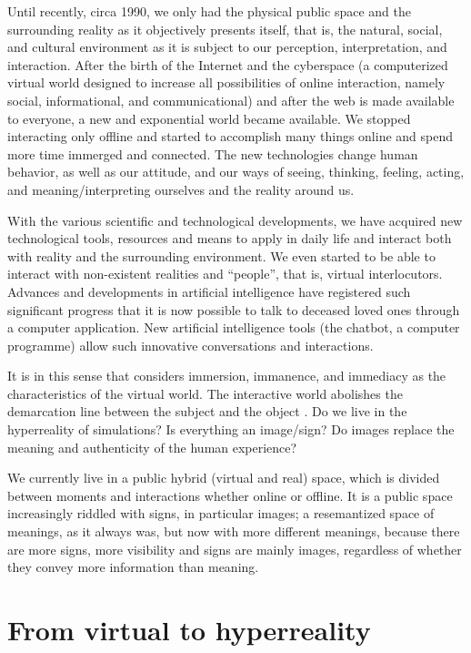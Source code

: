 \documentclass[english]{textolivre}
\begin{document}
Until recently, circa 1990, we only had the physical public space and the surrounding reality as it objectively presents itself, that is, the natural, social, and cultural environment as it is subject to our perception, interpretation, and interaction. After the birth of the Internet and the cyberspace (a computerized virtual world designed to increase all possibilities of online interaction, namely social, informational, and communicational) and after the web is made available to everyone, a new and exponential world became available. We stopped interacting only offline and started to accomplish many things online and spend more time immerged and connected. The new technologies change human behavior, as well as our attitude, and our ways of seeing, thinking, feeling, acting, and meaning/interpreting ourselves and the reality around us.

With the various scientific and technological developments, we have acquired new technological tools, resources and means to apply in daily life and interact both with reality and the surrounding environment. We even started to be able to interact with non-existent realities and “people”, that is, virtual interlocutors. Advances and developments in artificial intelligence have registered such significant progress that it is now possible to talk to deceased loved ones through a computer application. New artificial intelligence tools (the chatbot, a computer programme) allow such innovative conversations and interactions.

It is in this sense that \textcite[p.~31]{baudrillard_intelligence_2005} considers immersion, immanence, and immediacy as the characteristics of the virtual world. The interactive world abolishes the demarcation line between the subject and the object \cite[p.~78]{baudrillard_intelligence_2005}. Do we live in the hyperreality of simulations? Is everything an image/sign? Do images replace the meaning and authenticity of the human experience?

We currently live in a public hybrid (virtual and real) space, which is divided between moments and interactions whether online or offline. It is a public space increasingly riddled with signs, in particular images; a resemantized space of meanings, as it always was, but now with more different meanings, because there are more signs, more visibility and signs are mainly images, regardless of whether they convey more information than meaning.

\section{From virtual to hyperreality}
\end{document}
